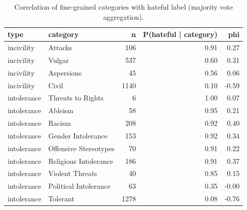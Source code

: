 \begin{table}
\caption{Correlation of fine-grained categories with hateful label (majority vote aggregation).}
\label{tab:granular_majority_vote}
\begin{tabular}{llrrr}
\toprule
type & category & n & P(hateful | category) & phi \\
\midrule
incivility & Attacks & 106 & 0.91 & 0.27 \\
incivility & Vulgar & 537 & 0.60 & 0.31 \\
incivility & Aspersions & 45 & 0.56 & 0.06 \\
incivility & Civil & 1140 & 0.10 & -0.59 \\
intolerance & Threats to Rights & 6 & 1.00 & 0.07 \\
intolerance & Ableism & 58 & 0.95 & 0.21 \\
intolerance & Racism & 208 & 0.92 & 0.40 \\
intolerance & Gender Intolerance & 153 & 0.92 & 0.34 \\
intolerance & Offensive Stereotypes & 70 & 0.91 & 0.22 \\
intolerance & Religious Intolerance & 186 & 0.91 & 0.37 \\
intolerance & Violent Threats & 40 & 0.85 & 0.15 \\
intolerance & Political Intolerance & 63 & 0.35 & -0.00 \\
intolerance & Tolerant & 1278 & 0.08 & -0.76 \\
\bottomrule
\end{tabular}
\end{table}
